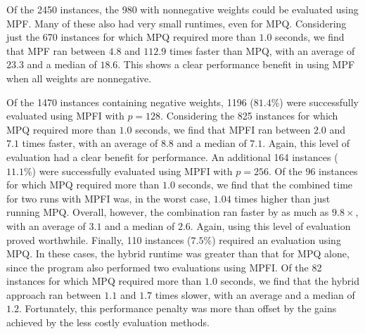 \documentclass[letterpaper,USenglish,cleveref, autoref, thm-restate]{lipics-v2021}
\begin{document}
Of the 2450 instances, the 980 with nonnegative weights could be evaluated using MPF\@.  Many of these also had very small runtimes, even for MPQ\@.
Considering just the 670 instances for which MPQ required more than $1.0$ seconds, we find that MPF ran between $4.8$ and $112.9$ times faster than MPQ, with an average of $23.3$ and a median of $18.6$.  This shows a clear performance benefit in using MPF when all weights are nonnegative.

Of the 1470 instances containing negative weights, 1196 ($81.4\%$)
were successfully evaluated using MPFI with $p=128$.  Considering the
825 instances for which MPQ required more than $1.0$ seconds, we find
that MPFI ran between $2.0$ and $7.1$ times faster, with an average of
$8.8$ and a median of $7.1$.  Again, this level of evaluation had a
clear benefit for performance.  An additional 164 instances
($11.1\%$) were successfully evaluated using MPFI with $p=256$.  Of
the 96 instances for which MPQ required more than $1.0$ seconds, we
find that the combined time for two runs with MPFI was, in the worst
case, $1.04$ times higher than just running MPQ\@.  Overall, however,
the combination ran faster by as much as $9.8\times$, with an average
of $3.1$ and a median of $2.6$.  Again, using this level of evaluation
proved worthwhile.  Finally, 110 instances ($7.5\%$) required an
evaluation using MPQ\@.  In these cases, the hybrid runtime was
greater than that for MPQ alone, since the program also performed two
evaluations using MPFI\@.  Of the 82 instances for which MPQ required
more than $1.0$ seconds, we find that the hybrid approach ran between
$1.1$ and $1.7$ times slower, with an average and a median of $1.2$.
Fortunately, this performance penalty was more than offset by the gains achieved by the less costly evaluation methods.
\end{document}
